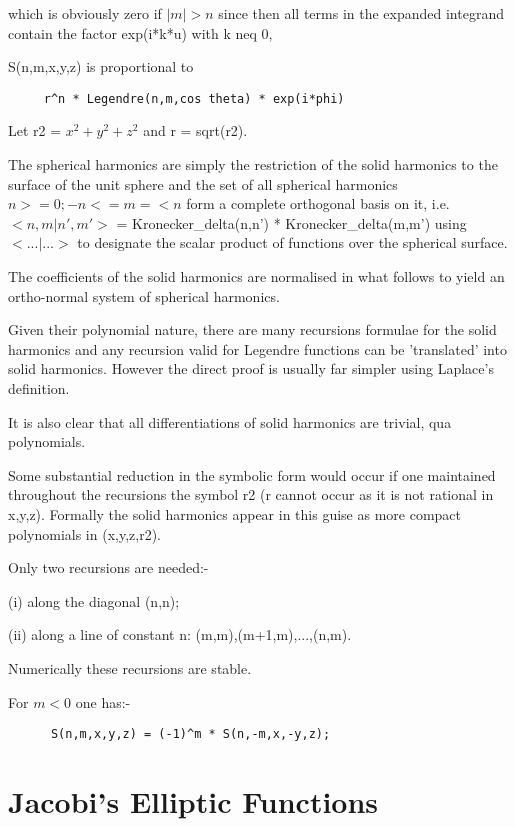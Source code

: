 which is obviously zero if $|m| > n$ since then all terms in the
expanded integrand contain the factor exp(i*k*u) with k neq 0,

S(n,m,x,y,z) is proportional to
\begin{verbatim}
     r^n * Legendre(n,m,cos theta) * exp(i*phi)
\end{verbatim}

Let r2 = $x^2 + y^2 + z^2$ and r = sqrt(r2).

The spherical harmonics are simply the restriction of the solid
harmonics to the surface of the unit sphere and the set of all
spherical harmonics {$n >=0; -n <= m =< n$} form a complete orthogonal
basis on it, i.e. $<n,m|n',m'>$ = Kronecker\_delta(n,n') *
Kronecker\_delta(m,m') using
$<...|...>$ to designate the scalar product
of functions over the spherical surface.

The coefficients of the solid harmonics are normalised in what
follows to yield an ortho-normal system of spherical harmonics.

Given their polynomial nature, there are many recursions formulae
for the solid harmonics and any recursion valid for Legendre functions
can be 'translated' into solid harmonics. However the direct proof is
usually far simpler using Laplace's definition.

It is also clear that all differentiations of solid harmonics are
trivial, qua polynomials.

Some substantial reduction in the symbolic form would occur if one
maintained throughout the recursions the symbol r2 (r cannot occur
as it is not rational in x,y,z). Formally the solid harmonics appear
in this guise as more compact polynomials in (x,y,z,r2).

Only two recursions are needed:-

(i) along the diagonal (n,n);

(ii) along a line of constant n: (m,m),(m+1,m),...,(n,m).

Numerically these recursions are stable.

For $m < 0$ one has:-

\begin{verbatim}
      S(n,m,x,y,z) = (-1)^m * S(n,-m,x,-y,z);
\end{verbatim}

\section{Jacobi's Elliptic Functions}

